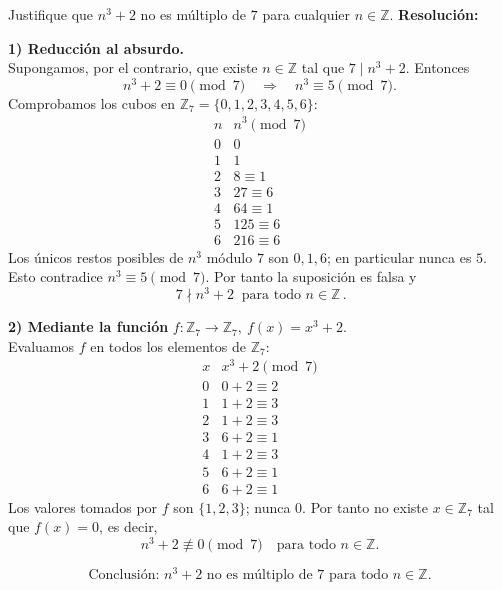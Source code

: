 \documentclass[a4paper,12pt]{article}
\begin{document}
\begin{ejercicio}[title=Ejercicio 48]
Justifique que $n^3 + 2$ no es múltiplo de $7$ para cualquier $n \in \mathbb{Z}$.
\tcblower
\textbf{Resolución:}

\textbf{1) Reducción al absurdo.}\\
Supongamos, por el contrario, que existe \(n\in\mathbb{Z}\) tal que \(7\mid n^3+2\). Entonces
\[
n^3+2\equiv 0\pmod{7}\quad\Longrightarrow\quad n^3\equiv 5\pmod{7}.
\]
Comprobamos los cubos en \(\mathbb{Z}_7=\{0,1,2,3,4,5,6\}\):
\[
\begin{array}{c|c}
n & n^3\pmod{7} \\ \hline
0 & 0\\
1 & 1\\
2 & 8\equiv1\\
3 & 27\equiv6\\
4 & 64\equiv1\\
5 & 125\equiv6\\
6 & 216\equiv6
\end{array}
\]
Los únicos restos posibles de \(n^3\) módulo \(7\) son \(0,1,6\); en particular nunca es \(5\). Esto contradice \(n^3\equiv5\pmod{7}\). Por tanto la suposición es falsa y
\[
\,7\nmid n^3+2\ \text{ para todo } n\in\mathbb{Z}\,.
\]

\textbf{2) Mediante la función }\(f:\mathbb{Z}_7\to\mathbb{Z}_7,\ f(x)=x^3+2.\)\\
Evaluamos \(f\) en todos los elementos de \(\mathbb{Z}_7\):
\[
\begin{array}{c|c}
x & x^3+2\pmod{7} \\ \hline
0 & 0+2\equiv2\\
1 & 1+2\equiv3\\
2 & 1+2\equiv3\\
3 & 6+2\equiv1\\
4 & 1+2\equiv3\\
5 & 6+2\equiv1\\
6 & 6+2\equiv1
\end{array}
\]
Los valores tomados por \(f\) son \(\{1,2,3\}\); nunca \(0\). Por tanto no existe \(x\in\mathbb{Z}_7\) tal que \(f(x)=0\), es decir,
\[
n^3+2\not\equiv0\pmod{7}\quad\text{para todo }n\in\mathbb{Z}.
\]

\[
\boxed{\text{Conclusión: } n^3 + 2 \text{ no es múltiplo de } 7 \text{ para todo } n \in \mathbb{Z}.}
\]
\end{ejercicio}
\end{document}
